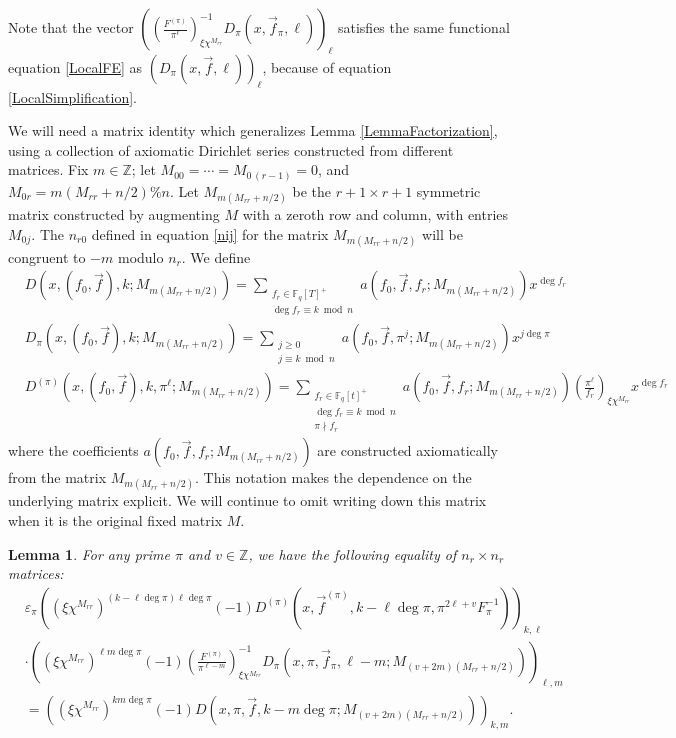 \documentclass[11pt,letterpaper]{article}
\newtheorem{lemma}[theorem]{Lemma}
\theoremstyle{definition}
\theoremstyle{remark}
\numberwithin{equation}{section}
\theoremstyle{dotless}
\newcommand{\Z}{\mathbb{Z}}
\newcommand{\F}{\mathbb{F}}
\newcommand{\res}[2]{\left(\frac{#1}{#2}\right)}
\begin{document}
Note that the vector $\left( \res{F^{(\pi)}}{\pi^\ell}_{\xi \chi^{M_{rr}}}^{-1} D_\pi(x, \vec{f}_\pi, \ell) \right)_\ell$ satisfies the same functional equation \eqref{LocalFE} as $\left(D_\pi(x, \vec{f}, \ell) \right)_\ell$, because of equation \eqref{LocalSimplification}.

We will need a matrix identity which generalizes Lemma \ref{LemmaFactorization}, using a collection of axiomatic Dirichlet series constructed from different matrices. Fix $m \in \mathbb Z$; let $M_{00}=\cdots=M_{0 \,(r-1)}=0$, and $M_{0r}= m(M_{rr} +n/2)\%n$. Let $M_{m(M_{rr} +n/2)}$ be the $r+1 \times r+1$ symmetric matrix constructed by augmenting $M$ with a zeroth row and column, with entries $M_{0j}$. The $n_{r0}$ defined in equation \eqref{nij} for the matrix $M_{m(M_{rr} +n/2)}$ will be congruent to $-m$ modulo $n_{r}$. We define
\begin{align*}
&D(x, (f_0, \vec{f}), k; M_{m(M_{rr} +n/2)}) = \sum_{\substack{f_r \in \F_q[T]^+ \\ \deg f_r \equiv k \bmod n}} a(f_0, \vec{f}, f_r; M_{m(M_{rr} +n/2)}) x^{\deg f_r} \\
&D_\pi(x, (f_0, \vec{f}), k; M_{m(M_{rr} +n/2)}) = \sum_{\substack{j\geq 0 \\ j \equiv k \bmod n}} a(f_0, \vec{f}, \pi^j; M_{m(M_{rr} +n/2)}) x^{j\deg \pi} \\
&D^{(\pi)}(x, (f_0, \vec{f}), k, \pi^\ell; M_{m(M_{rr} +n/2)}) = \sum_{\substack{ f_r \in \F_q[t]^+ \\ \deg f_r \equiv k \bmod n \\ \pi \nmid f_r}} a(f_0, \vec{f},f_r; M_{m(M_{rr} +n/2)}) \res{\pi^\ell}{f_r}_{\xi \chi^{M_{rr}}} x^{\deg f_r}
\end{align*}
where the coefficients $a(f_0, \vec{f}, f_r; M_{m(M_{rr} +n/2)})$ are constructed axiomatically from the matrix $M_{m(M_{rr} +n/2)}$. This notation makes the dependence on the underlying matrix explicit. We will continue to omit writing down this matrix when it is the original fixed matrix $M$. 

\begin{lemma}\label{LemmaStrongFactorization}
For any prime $\pi$ and $v \in \Z$, we have the following equality of $n_r \times n_r$ matrices:
\begin{equation} \label{StrongFactorization}
\begin{split}
&\varepsilon_\pi \left( (\xi \chi^{M_{rr}})^{(k-\ell\deg \pi)\ell \deg \pi} (-1)  D^{(\pi)}(x, \vec{f}^{(\pi)}, k-\ell \deg \pi, \pi^{2\ell+v}F_\pi^{-1}) \right)_{k, \ell} \\
&\cdot \left((\xi \chi^{M_{rr}})^{\ell m \deg \pi}(-1) \res{F^{(\pi)}}{\pi^{\ell-m}}_{\xi \chi^{M_{rr}}}^{-1}D_\pi(x, \pi, \vec{f}_\pi, \ell-m; M_{(v+2m)(M_{rr}+n/2)}) \right)_{\ell,m} \\
&= \left( (\xi \chi^{M_{rr}})^{k m \deg \pi}(-1)D(x, \pi, \vec{f}, k-m\deg \pi; M_{(v+2m)(M_{rr}+n/2)}) \right)_{k,m}.
\end{split}
\end{equation}
\end{lemma}
\end{document}
